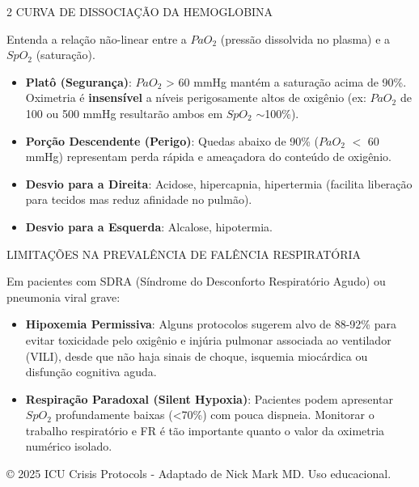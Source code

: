 \documentclass[10pt,a4paper]{article}
\begin{document}
\begin{multicols}{2}
\vspace{0.3cm}
\textcolor{crisisBlue}{\headerfont\large CURVA DE DISSOCIAÇÃO DA HEMOGLOBINA}\par
\vspace{0.1cm}
{\small Entenda a relação não-linear entre a $PaO_2$ (pressão dissolvida no plasma) e a $SpO_2$ (saturação).}\par
\begin{itemize}
    \setlength{\itemsep}{1pt}
    \item {\small \textbf{Platô (Segurança)}: $PaO_2$ > 60 mmHg mantém a saturação acima de 90\%. Oximetria é \textbf{insensível} a níveis perigosamente altos de oxigênio (ex: $PaO_2$ de 100 ou 500 mmHg resultarão ambos em $SpO_2$ $\sim$100\%).}
    \item {\small \textbf{Porção Descendente (Perigo)}: Quedas abaixo de 90\% ($PaO_2$ $<$ 60 mmHg) representam perda rápida e ameaçadora do conteúdo de oxigênio.}
    \item {\small \textbf{Desvio para a Direita}: Acidose, hipercapnia, hipertermia (facilita liberação para tecidos mas reduz afinidade no pulmão).}
    \item {\small \textbf{Desvio para a Esquerda}: Alcalose, hipotermia.}
\end{itemize}

\vspace{0.3cm}
\textcolor{crisisBlue}{\headerfont\large LIMITAÇÕES NA PREVALÊNCIA DE FALÊNCIA RESPIRATÓRIA}\par
\vspace{0.1cm}
{\small Em pacientes com SDRA (Síndrome do Desconforto Respiratório Agudo) ou pneumonia viral grave:}
\begin{itemize}
    \setlength{\itemsep}{1pt}
    \item {\small \textbf{Hipoxemia Permissiva}: Alguns protocolos sugerem alvo de 88-92\% para evitar toxicidade pelo oxigênio e injúria pulmonar associada ao ventilador (VILI), desde que não haja sinais de choque, isquemia miocárdica ou disfunção cognitiva aguda.}
    \item {\small \textbf{Respiração Paradoxal (Silent Hypoxia)}: Pacientes podem apresentar $SpO_2$ profundamente baixas (<70\%) com pouca dispneia. Monitorar o trabalho respiratório e FR é tão importante quanto o valor da oximetria numérico isolado.}
\end{itemize}

\end{multicols}

\vfill
\begin{center}
    {\fontsize{7}{9}\selectfont \textcolor{crisisGray}{© 2025 ICU Crisis Protocols - Adaptado de Nick Mark MD. Uso educacional.}}
\end{center}
\end{document}
